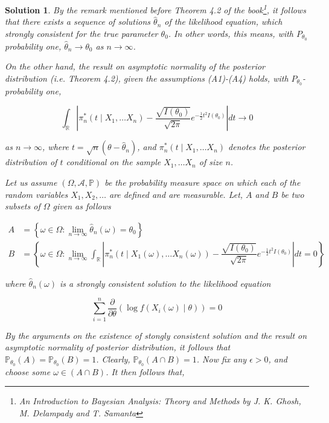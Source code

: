 \documentclass[12pt]{article}
\theoremstyle{problemstyle}
\newtheorem*{solution*}{Solution}
\newcommand{\prob}{\mathbb{P}}
\newcommand{\R}{\mathbb{R}}
\begin{document}
\begin{solution*}
    By the remark mentioned before Theorem 4.2 of the book\footnote{An Introduction to Bayesian Analysis: Theory and Methods by J. K. Ghosh, M. Delampady and T. Samanta}, it follows that there exists a sequence of solutions $\widehat{\theta}_n$ of the likelihood equation, which strongly consistent for the true parameter $\theta_0$. In other words, this means, with $P_{\theta_0}$ probability one, $\widehat{\theta}_n \rightarrow \theta_0$ as $n \rightarrow \infty$. 

    On the other hand, the result on asymptotic normality of the posterior distribution (i.e. Theorem 4.2), given the assumptions (A1)-(A4) holds, with $P_{\theta_0}$-probability one, 

    $$
    \int_{\R} \left\vert \pi_n^\ast(t \mid X_1, \dots X_n) - \dfrac{\sqrt{I(\theta_0)}}{\sqrt{2\pi}} e^{-\frac{1}{2}t^2I(\theta_0)} \right\vert dt \rightarrow 0 
    $$

    as $n\rightarrow \infty$, where $t = \sqrt{n}(\theta - \widehat{\theta}_n)$, and $\pi_n^\ast(t \mid X_1, \dots X_n)$ denotes the posterior distribution of $t$ conditional on the sample $X_1, \dots X_n$ of size $n$. 

    Let us assume $(\Omega, \mathcal{A}, \prob)$ be the probability measure space on which each of the random variables $X_1, X_2, \ldots$ are defined and are measurable. Let, $A$ and $B$ be two subsets of $\Omega$ given as follows

    \begin{align*}
        A & = \left\{ \omega \in \Omega : \lim_{n\rightarrow \infty}\widehat{\theta}_n(\omega) = \theta_0 \right\}\\
        B & = \left\{ \omega \in \Omega : \lim_{n \rightarrow \infty} \int_{\R} \left\vert \pi_n^\ast(t \mid X_1(\omega), \dots X_n(\omega)) - \dfrac{\sqrt{I(\theta_0)}}{\sqrt{2\pi}} e^{-\frac{1}{2}t^2I(\theta_0)} \right\vert dt = 0 \right\}
    \end{align*}

    where $\widehat{\theta}_n(\omega)$ is a strongly consistent solution to the likelihood equation 
    
    $$\sum_{i=1}^n \dfrac{\partial}{\partial \theta}\left(\log f(X_i(\omega) \mid \theta)\right) = 0$$

    By the arguments on the existence of stongly consistent solution and the result on asymptotic normality of posterior distribution, it follows that $\prob_{\theta_0}(A) = \prob_{\theta_0}(B) = 1$. Clearly, $\prob_{\theta_0}(A \cap B) = 1$. Now fix any $\epsilon > 0$, and choose some $\omega \in (A \cap B)$. It then follows that,


\end{solution*}
\end{document}
